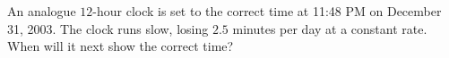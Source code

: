 An analogue $12$-hour clock is set to the correct time at 11{:}48 PM on December 31, 2003. The clock runs slow, losing $2.5$ minutes per day at a constant rate. When will it next show the correct time?
